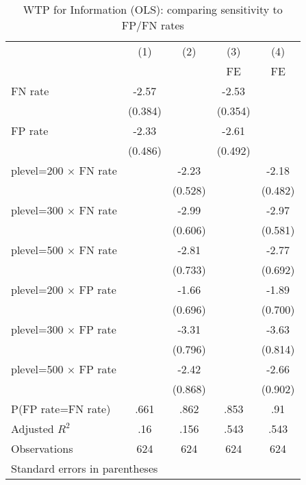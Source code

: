 \begin{table}[htbp]\centering
\caption{WTP for Information (OLS): comparing sensitivity to FP/FN rates}
\begin{tabular}{l*{4}{c}}
\hline\hline
                &\multicolumn{1}{c}{(1)}&\multicolumn{1}{c}{(2)}&\multicolumn{1}{c}{(3)}&\multicolumn{1}{c}{(4)}\\
                &\multicolumn{1}{c}{}&\multicolumn{1}{c}{}&\multicolumn{1}{c}{FE}&\multicolumn{1}{c}{FE}\\
\hline
FN rate         &    -2.57&         &    -2.53&         \\
                &  (0.384)&         &  (0.354)&         \\
FP rate         &    -2.33&         &    -2.61&         \\
                &  (0.486)&         &  (0.492)&         \\
plevel=200 $\times$ FN rate&         &    -2.23&         &    -2.18\\
                &         &  (0.528)&         &  (0.482)\\
plevel=300 $\times$ FN rate&         &    -2.99&         &    -2.97\\
                &         &  (0.606)&         &  (0.581)\\
plevel=500 $\times$ FN rate&         &    -2.81&         &    -2.77\\
                &         &  (0.733)&         &  (0.692)\\
plevel=200 $\times$ FP rate&         &    -1.66&         &    -1.89\\
                &         &  (0.696)&         &  (0.700)\\
plevel=300 $\times$ FP rate&         &    -3.31&         &    -3.63\\
                &         &  (0.796)&         &  (0.814)\\
plevel=500 $\times$ FP rate&         &    -2.42&         &    -2.66\\
                &         &  (0.868)&         &  (0.902)\\
\hline
P(FP rate=FN rate)&     .661&     .862&     .853&      .91\\
Adjusted \(R^{2}\)&      .16&     .156&     .543&     .543\\
Observations    &      624&      624&      624&      624\\
\hline\hline
\multicolumn{5}{l}{\footnotesize Standard errors in parentheses}\\
\end{tabular}
\end{table}
